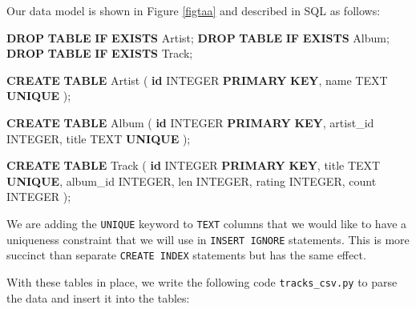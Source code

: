 \documentclass[10pt,]{book}
\newenvironment{Shaded}{}{}
\newcommand{\ControlFlowTok}[1]{\textcolor[rgb]{0.00,0.44,0.13}{\textbf{#1}}}
\newcommand{\DataTypeTok}[1]{\textcolor[rgb]{0.56,0.13,0.00}{#1}}
\newcommand{\FunctionTok}[1]{\textcolor[rgb]{0.02,0.16,0.49}{#1}}
\newcommand{\KeywordTok}[1]{\textcolor[rgb]{0.00,0.44,0.13}{\textbf{#1}}}
\newcommand{\NormalTok}[1]{#1}
\begin{document}
Our data model is shown in Figure \ref{figtaa} and described in SQL as
follows:

\begin{Shaded}
\begin{Highlighting}[]
\KeywordTok{DROP} \KeywordTok{TABLE} \ControlFlowTok{IF} \KeywordTok{EXISTS}\NormalTok{ Artist;}
\KeywordTok{DROP} \KeywordTok{TABLE} \ControlFlowTok{IF} \KeywordTok{EXISTS}\NormalTok{ Album;}
\KeywordTok{DROP} \KeywordTok{TABLE} \ControlFlowTok{IF} \KeywordTok{EXISTS}\NormalTok{ Track;}

\KeywordTok{CREATE} \KeywordTok{TABLE}\NormalTok{ Artist (}
    \KeywordTok{id} \DataTypeTok{INTEGER} \KeywordTok{PRIMARY} \KeywordTok{KEY}\NormalTok{,}
\NormalTok{    name TEXT }\KeywordTok{UNIQUE}
\NormalTok{);}

\KeywordTok{CREATE} \KeywordTok{TABLE}\NormalTok{ Album (}
    \KeywordTok{id} \DataTypeTok{INTEGER} \KeywordTok{PRIMARY} \KeywordTok{KEY}\NormalTok{,}
\NormalTok{    artist\_id  }\DataTypeTok{INTEGER}\NormalTok{,}
\NormalTok{    title TEXT }\KeywordTok{UNIQUE}
\NormalTok{);}

\KeywordTok{CREATE} \KeywordTok{TABLE}\NormalTok{ Track (}
    \KeywordTok{id} \DataTypeTok{INTEGER} \KeywordTok{PRIMARY} \KeywordTok{KEY}\NormalTok{,}
\NormalTok{    title TEXT }\KeywordTok{UNIQUE}\NormalTok{,}
\NormalTok{    album\_id }\DataTypeTok{INTEGER}\NormalTok{,}
\NormalTok{    len }\DataTypeTok{INTEGER}\NormalTok{, rating }\DataTypeTok{INTEGER}\NormalTok{, }\FunctionTok{count} \DataTypeTok{INTEGER}
\NormalTok{);}
\end{Highlighting}
\end{Shaded}

We are adding the \texttt{UNIQUE} keyword to \texttt{TEXT} columns that
we would like to have a uniqueness constraint that we will use in
\texttt{INSERT\ IGNORE} statements. This is more succinct than separate
\texttt{CREATE\ INDEX} statements but has the same effect.

With these tables in place, we write the following code
\texttt{tracks\_csv.py} to parse the data and insert it into the tables:
\end{document}

